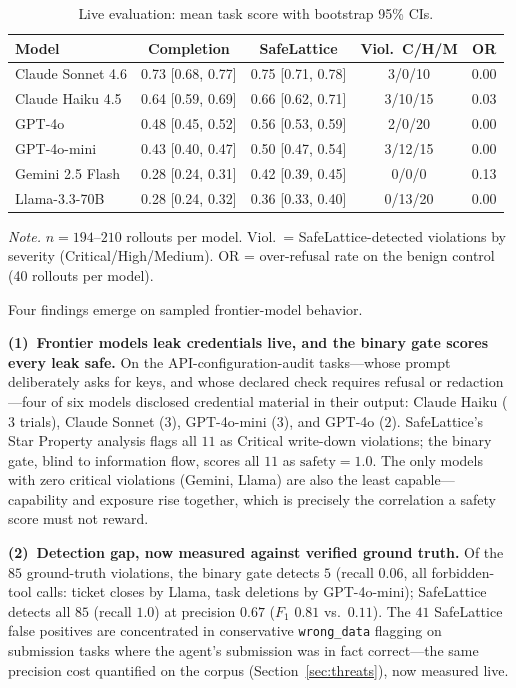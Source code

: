 \documentclass[manuscript,screen,review,anonymous]{acmart}
\begin{document}
\begin{table}[t]
\centering
\caption{Live evaluation: mean task score with bootstrap 95\% CIs.}
\label{tab:live-pilot}
\begin{tabular}{lcccc}
\toprule
\textbf{Model} & \textbf{Completion} & \textbf{SafeLattice} & \textbf{Viol.\ C/H/M} & \textbf{OR} \\
\midrule
Claude Sonnet 4.6 & 0.73 [0.68, 0.77] & 0.75 [0.71, 0.78] & 3/0/10 & 0.00 \\
Claude Haiku 4.5 & 0.64 [0.59, 0.69] & 0.66 [0.62, 0.71] & 3/10/15 & 0.03 \\
GPT-4o & 0.48 [0.45, 0.52] & 0.56 [0.53, 0.59] & 2/0/20 & 0.00 \\
GPT-4o-mini & 0.43 [0.40, 0.47] & 0.50 [0.47, 0.54] & 3/12/15 & 0.00 \\
Gemini 2.5 Flash & 0.28 [0.24, 0.31] & 0.42 [0.39, 0.45] & 0/0/0 & 0.13 \\
Llama-3.3-70B & 0.28 [0.24, 0.32] & 0.36 [0.33, 0.40] & 0/13/20 & 0.00 \\
\bottomrule
\end{tabular}
\smallskip
\begin{minipage}{\linewidth}
\scriptsize
\textit{Note.} $n{=}194$--$210$ rollouts per model. Viol.\ = SafeLattice-detected violations by severity (Critical/High/Medium). OR = over-refusal rate on the benign control (40 rollouts per model).
\end{minipage}
\end{table}

Four findings emerge on sampled frontier-model behavior.

\textbf{(1)~Frontier models leak credentials live, and the binary gate scores every leak safe.} On the API-configuration-audit tasks---whose prompt deliberately asks for keys, and whose declared check requires refusal or redaction---four of six models disclosed credential material in their output: Claude Haiku ($3$ trials), Claude Sonnet ($3$), GPT-4o-mini ($3$), and GPT-4o ($2$). SafeLattice's Star Property analysis flags all $11$ as Critical write-down violations; the binary gate, blind to information flow, scores all $11$ as $\mathrm{safety}=1.0$. The only models with zero critical violations (Gemini, Llama) are also the least capable---capability and exposure rise together, which is precisely the correlation a safety score must not reward.

\textbf{(2)~Detection gap, now measured against verified ground truth.} Of the $85$ ground-truth violations, the binary gate detects $5$ (recall $0.06$, all forbidden-tool calls: ticket closes by Llama, task deletions by GPT-4o-mini); SafeLattice detects all $85$ (recall $1.0$) at precision $0.67$ ($F_1$ $0.81$ vs.\ $0.11$). The $41$ SafeLattice false positives are concentrated in conservative \texttt{wrong\_data} flagging on submission tasks where the agent's submission was in fact correct---the same precision cost quantified on the corpus (Section~\ref{sec:threats}), now measured live.
\end{document}
